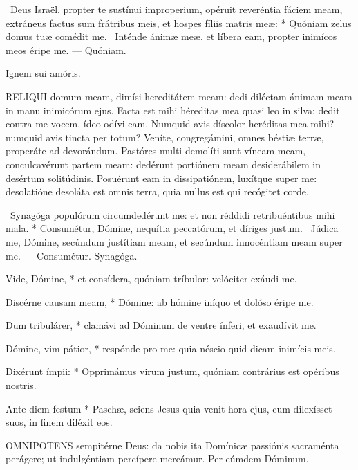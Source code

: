 \R\ Deus Israël, propter te sustínui improperium, opéruit reveréntia fáciem meam, extráneus factus sum frátribus meis, et hospes fíliis matris meæ: * Quóniam zelus domus tuæ comédit me. \V\ Inténde ánimæ meæ, et líbera eam, propter inimícos meos éripe me. --- Quóniam.

 Ignem sui amóris.


\lettrine[lines=2]{R}{ELIQUI} domum meam, dimísi hereditátem meam: dedi diléctam ánimam meam in manu inimicórum ejus. Facta est mihi héreditas mea quasi leo in silva: dedit contra me vocem, ídeo odívi eam. Numquid avis díscolor heréditas mea mihi? numquid avis tincta per totum? Veníte, congregámini, omnes béstiæ terræ, properáte ad devorándum. Pastóres multi demolíti sunt víneam meam, conculcavérunt partem meam: dedérunt portiónem meam desiderábilem in desértum solitúdinis. Posuérunt eam in dissipatiónem, luxítque super me: desolatióne desoláta est omnis terra, quia nullus est qui recógitet corde.

\R\ Synagóga populórum circumdedérunt me: et non réddidi retribuéntibus mihi mala. * Consumétur, Dómine, nequítia peccatórum, et díriges justum. \V\ Júdica me, Dómine, secúndum justítiam meam, et secúndum innocéntiam meam super me. --- Consumétur. Synagóga.



 Vide, Dómine, * et consídera, quóniam tríbulor: velóciter exáudi me.


 Discérne causam meam, * Dómine: ab hómine iníquo et dolóso éripe me.

 Dum tribulárer, * clamávi ad Dóminum de ventre ínferi, et exaudívit me.

 Dómine, vim pátior, * respónde pro me: quia néscio quid dicam inimícis meis.

 Dixérunt ímpii: * Opprimámus virum justum, quóniam contrárius est opéribus nostris.

 Ante diem festum * Paschæ, sciens Jesus quia venit hora ejus, cum dilexísset suos, in finem diléxit eos.


\lettrine[lines=2]{O}{MNIPOTENS} sempitérne Deus: da nobis ita Domínicæ passiónis sacraménta perágere; ut indulgéntiam percípere mereámur. Per eúmdem Dóminum.

